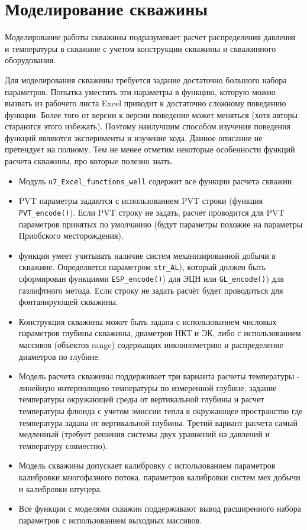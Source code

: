 \section{Моделирование скважины}
Моделирование работы скважины подразумевает расчет распределения давления и температуры в скважине с учетом конструкции скважины и скважинного оборудования. 

Для моделирования скважины требуется задание достаточно большого набора параметров. Попытка уместить эти параметры в функцию, которую можно вызвать из рабочего листа Excel приводит к достаточно сложному поведению функции. Более того от версии к версии поведение может меняться (хотя авторы стараются этого избежать). Поэтому наилучшим способом изучения поведения функций являются эксперименты и изучение кода. Данное описание не претендует на полному. Тем не менее отметим некоторые особенности функций расчета скважины, про которые полезно знать.

\begin{itemize}
	\item Модуль  \texttt{u7_Excel_functions_well} содержит все функции расчета скважин.
	\item PVT параметры задаются с использованием PVT строки (функция \texttt{PVT_encode()}). Если PVT строку не задать, расчет проводится для PVT параметров принятых по умолчанию (будут параметры похожие на параметры Приобского месторождения). 
	\item функция умеет учитывать наличие систем механизированной добычи в скважине. Определяется параметром  \texttt{str_AL}), который должен быть сформирован функциями \texttt{ESP_encode()}) для ЭЦН или \texttt{GL_encode()}) для газлифтного метода. Если строку не задать расчёт будет проводиться для фонтанирующей скважины.
	\item  Конструкция скважины может быть задана с использованием числовых параметров глубины скважины, диаметров НКТ и ЭК, либо с использованием массивов (объектов range) содержащих инклинометрию и распределение диаметров по глубине. 
	\item  Модель расчета скважины поддерживает три варианта расчеты температуры - линейную интерполяцию температуры по измеренной глубине, задание температуры окружающей среды от вертикальной глубины и расчет температуры флюида с учетом эмиссии тепла в окружающее пространство где температура задана от вертикальной глубины. Третий вариант расчета самый медленный (требует решения системы двух уравнений на давлений и температуру совместно).
	\item  Модель скважины допускает калибровку с использованием параметров калибровки многофазного потока, параметров калибровки систем мех добычи и калибровки штуцера.
	\item  Все функции с моделями скважин поддерживают вывод расширенного набора параметров с использованием выходных массивов.
\end{itemize}

